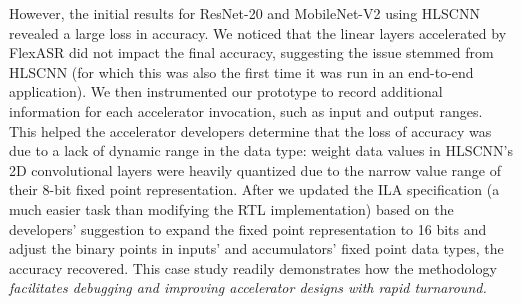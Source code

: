 

However, the initial results for ResNet-20 and MobileNet-V2
  using HLSCNN
  revealed a large loss in accuracy.
We noticed that the linear layers 
  accelerated by FlexASR 
  did not impact the final accuracy,
  suggesting the issue stemmed from HLSCNN
  (for which this was also the first time it was run in an end-to-end application).
We then instrumented
  our {\TLA} prototype 
  to record additional information
  for each accelerator invocation,
  such as input and output ranges.
This helped 
  the accelerator developers
  determine that the loss of accuracy
  was due to a lack of dynamic range in the data type:
  weight data values 
  in HLSCNN's 2D convolutional layers
  were heavily quantized
  due to the narrow value range
  of their 8-bit fixed point representation.
After we updated the ILA specification (a much easier task than modifying the RTL implementation) based on the developers' suggestion to expand the fixed point representation to 16 bits and adjust the binary points in inputs' and accumulators' fixed point data types, the %
accuracy recovered.
  This case study readily demonstrates
  how the {\TLA} methodology
  \textit{facilitates debugging and improving accelerator designs
  with rapid turnaround.}

%
%
%
%


